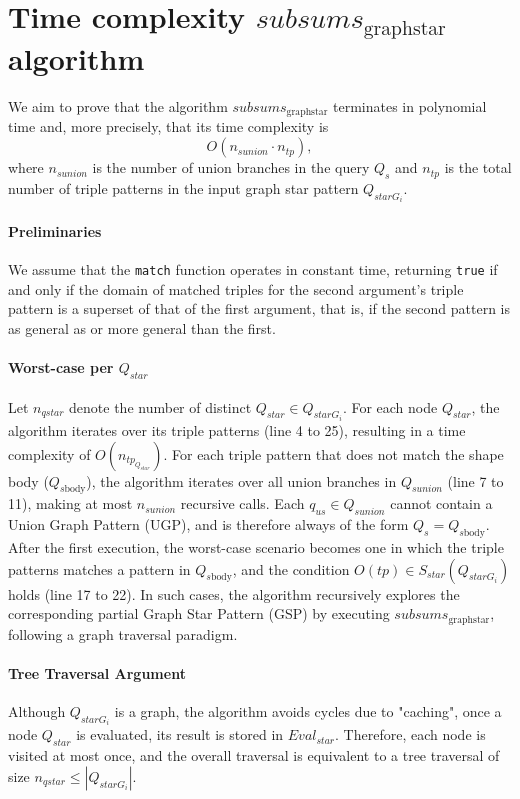 \section{Time complexity $subsums_{\mathrm{graph star}}$ algorithm}




We aim to prove that the algorithm $subsums_{\mathrm{graph star}}$ terminates in polynomial time and, more precisely, that its time complexity is
\begin{equation}
O(n_{sunion} \cdot n_{tp}),
\end{equation}
where $n_{sunion}$ is the number of union branches in the query $Q_s$ and $n_{tp}$ is the total number of triple patterns in the input graph star pattern $Q_{starG_i}$.

\paragraph{Preliminaries}
We assume that the \texttt{match} function operates in constant time, returning \texttt{true} if and only if the domain of matched triples for the second argument's triple pattern is a superset of that of the first argument, that is, if the second pattern is as general as or more general than the first.

\paragraph{Worst-case per $Q_{star}$}
Let $n_{qstar}$ denote the number of distinct $Q_{star} \in Q_{starG_i}$.
For each node $Q_{star}$, the algorithm iterates over its triple patterns (line 4 to 25), resulting in a time complexity of $O(n_{tp_{Q_{star}}})$.
For each triple pattern that does not match the shape body ($Q_{s\mathrm{body}}$), the algorithm iterates over all union branches in $Q_{sunion}$ (line 7 to 11), making at most $n_{sunion}$ recursive calls.
Each $q_{us} \in Q_{sunion}$ cannot contain a Union Graph Pattern (UGP), and is therefore always of the form $Q_s = Q_{s\mathrm{body}}$.
After the first execution, the worst-case scenario becomes one in which the triple patterns matches a pattern in $Q_{s\mathrm{body}}$, and the condition $O(tp) \in S_{star}(Q_{starG_i})$ holds (line 17 to 22).
In such cases, the algorithm recursively explores the corresponding partial Graph Star Pattern (GSP) by executing $subsums_{\mathrm{graph star}}$, following a graph traversal paradigm.


\paragraph{Tree Traversal Argument}
Although $Q_{starG_i}$ is a graph, the algorithm avoids cycles due to "caching", once a node $Q_{star}$ is evaluated, its result is stored in $Eval_{star}$.
Therefore, each node is visited at most once, and the overall traversal is equivalent to a tree traversal of size $n_{qstar} \leq |Q_{starG_i}|$.

